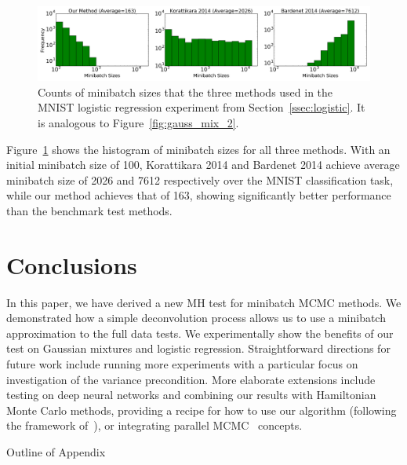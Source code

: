 \documentclass{article}
\begin{document}
\begin{figure}[t]
	\centering
	\includegraphics[width=1\linewidth]{minibatch_size_logistic.png}
	\caption{
    Counts of minibatch sizes that the three methods used in the MNIST logistic
    regression experiment from Section~\ref{ssec:logistic}. It is analogous to
    Figure~\ref{fig:gauss_mix_2}.
    }
	\label{fig:logistic_minibatch}
\end{figure}

Figure~\ref{fig:logistic_minibatch} shows the histogram of minibatch sizes for
all three methods. With an initial minibatch size of 100, Korattikara 2014 and
Bardenet 2014 achieve average minibatch size of 2026 and 7612 respectively over
the MNIST classification task, while our method achieves that of 163, showing
significantly better performance than the benchmark test methods.



\section{Conclusions}\label{sec:conclusion}

In this paper, we have derived a new MH test for minibatch MCMC methods. We
demonstrated how a simple deconvolution process allows us to use a minibatch
approximation to the full data tests. We experimentally show the benefits of our
test on Gaussian mixtures and logistic regression.  Straightforward directions
for future work include running more experiments with a particular focus on
investigation of the variance precondition.  More elaborate extensions include
testing on deep neural networks and combining our results with Hamiltonian Monte
Carlo methods, providing a recipe for how to use our algorithm (following the
framework of~\cite{sgmcmc_2015}), or integrating parallel
MCMC~\cite{conf/uai/AngelinoKWSA14,conf/icml/AhnSW14} concepts.


\small


\normalsize

\clearpage
\appendix

\begin{center}
{\Large Outline of Appendix}
\end{center}
\end{document}
